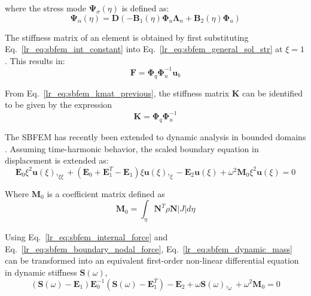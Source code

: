 where the stress mode $\mathbf{\Psi}_\sigma(\eta)$ is defined as:
\begin{equation}
    \mathbf{\Psi}_\alpha(\eta) =    \mathbf{D}(
                                       -\mathbf{B}_1(\eta) \mathbf{\Phi}_u \mathbf{\Lambda}_n +
                                        \mathbf{B}_2(\eta) \mathbf{\Phi}_u
                                    )
    \label{lr_eq:sbfem_stress_mode}
\end{equation}

The stiffness matrix of an element is obtained by first substituting Eq.~\ref{lr_eq:sbfem_int_constant} into Eq.~\ref{lr_eq:sbfem_general_sol_str} at $\xi=1$.
This results in:
\begin{equation}
    \mathbf{F} = \mathbf{\Phi}_q \mathbf{\Phi}_u^{-1} \mathbf{u}_b
    \label{lr_eq:sbfem_kmat_previous}
\end{equation}

From Eq.~\ref{lr_eq:sbfem_kmat_previous}, the stiffness matrix $\mathbf{K}$ can be identified to be given by the expression
\begin{equation}
    \mathbf{K} = \mathbf{\Phi}_q \mathbf{\Phi}_u^{-1}
    \label{lr_eq:sbfem_kmat}
\end{equation}

The SBFEM has recently been extended to dynamic analysis in bounded domains \cite{Song2009}.
Assuming time-harmonic behavior, the scaled boundary equation in displacement is extended as:
\begin{equation}
    \mathbf{E}_0 \xi^2 \mathbf{u}(\xi),_{\xi\xi} +
    (\mathbf{E}_0 + \mathbf{E}_1^T - \mathbf{E}_1)\xi \mathbf{u}(\xi),_{\xi} -
    \mathbf{E}_2 \mathbf{u}(\xi) + \omega^2 \mathbf{M}_0 \xi^2 \mathbf{u}(\xi) = 0
    \label{lr_eq:sbfem_dynamic}
\end{equation}

Where $\mathbf{M}_0$ is a coefficient matrix defined as
\begin{equation}
    \mathbf{M}_0 = \int_\eta \mathbf{N}^T \rho \mathbf{N}|J| d\eta
    \label{lr_eq:sbfem_dynamic_mass}
\end{equation}

Using Eq.~\ref{lr_eq:sbfem_internal_force} and Eq.~\ref{lr_eq:sbfem_boundary_nodal_force}, Eq.~\ref{lr_eq:sbfem_dynamic_mass} can be transformed into an equivalent first-order non-linear differential equation in dynamic stiffness $\mathbf{S}(\omega)$,
\begin{equation}
    (\mathbf{S}(\omega)-\mathbf{E}_1)\mathbf{E}_0^{-1}
    (\mathbf{S}(\omega)-\mathbf{E}_1^T) - \mathbf{E}_2 +
    \omega \mathbf{S}(\omega),_\omega + \omega^2 \mathbf{M}_0 = 0
    \label{lr_eq:sbfem_dynamic_1stODE}
\end{equation}

